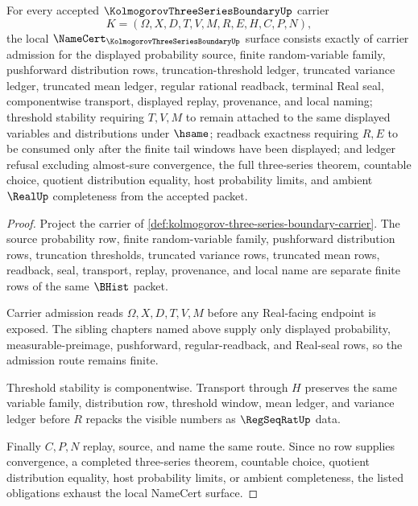 \begin{theorem}
\label{thm:kolmogorov-three-series-boundary-namecert-obligations}
For every accepted $\KolmogorovThreeSeriesBoundaryUp$ carrier
$$
K=(\Omega,X,D,T,V,M,R,E,H,C,P,N),
$$
the local $\NameCert_{\KolmogorovThreeSeriesBoundaryUp}$ surface consists exactly of carrier admission for the displayed probability source, finite random-variable family, pushforward distribution rows, truncation-threshold ledger, truncated variance ledger, truncated mean ledger, regular rational readback, terminal Real seal, componentwise transport, displayed replay, provenance, and local naming; threshold stability requiring $T,V,M$ to remain attached to the same displayed variables and distributions under $\hsame$; readback exactness requiring $R,E$ to be consumed only after the finite tail windows have been displayed; and ledger refusal excluding almost-sure convergence, the full three-series theorem, countable choice, quotient distribution equality, host probability limits, and ambient $\RealUp$ completeness from the accepted packet.
\end{theorem}
\begin{proof}
Project the carrier of \autoref{def:kolmogorov-three-series-boundary-carrier}. The source probability row, finite random-variable family, pushforward distribution rows, truncation thresholds, truncated variance rows, truncated mean rows, readback, seal, transport, replay, provenance, and local name are separate finite rows of the same $\BHist$ packet.

Carrier admission reads $\Omega,X,D,T,V,M$ before any Real-facing endpoint is exposed. The sibling chapters named above supply only displayed probability, measurable-preimage, pushforward, regular-readback, and Real-seal rows, so the admission route remains finite.

Threshold stability is componentwise. Transport through $H$ preserves the same variable family, distribution row, threshold window, mean ledger, and variance ledger before $R$ repacks the visible numbers as $\RegSeqRatUp$ data.

Finally $C,P,N$ replay, source, and name the same route. Since no row supplies convergence, a completed three-series theorem, countable choice, quotient distribution equality, host probability limits, or ambient completeness, the listed obligations exhaust the local NameCert surface.
\end{proof}

